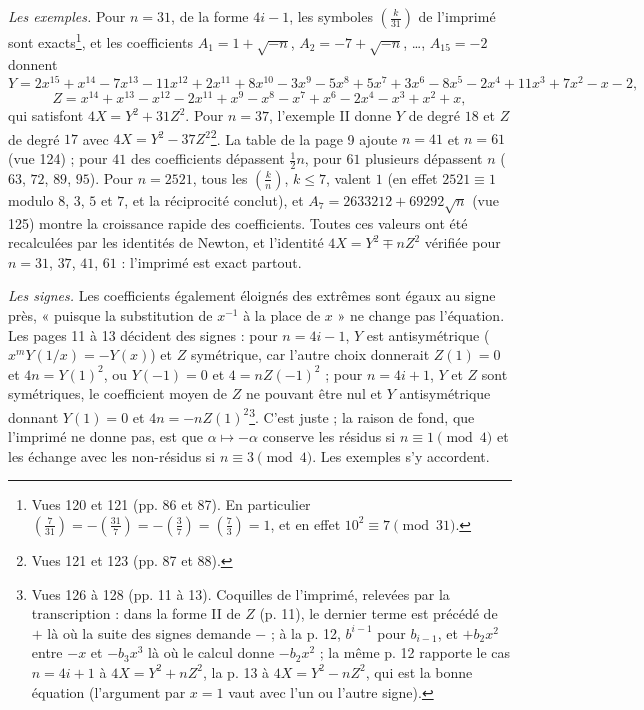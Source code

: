 \documentclass[11pt,a4paper]{article}
\begin{document}
\emph{Les exemples.} Pour $n=31$, de la forme $4i-1$, les symboles $\left(\frac{k}{31}\right)$ de l'imprimé sont exacts\footnote{Vues 120 et 121 (pp. 86 et 87). En particulier $\left(\frac{7}{31}\right)=-\left(\frac{31}{7}\right)=-\left(\frac37\right)=\left(\frac73\right)=1$, et en effet $10^2\equiv7\pmod{31}$.}, et les coefficients $A_1=1+\sqrt{-n}$, $A_2=-7+\sqrt{-n}$, …, $A_{15}=-2$ donnent
\[ Y=2x^{15}+x^{14}-7x^{13}-11x^{12}+2x^{11}+8x^{10}-3x^9-5x^8+5x^7+3x^6-8x^5-2x^4+11x^3+7x^2-x-2, \]
\[ Z=x^{14}+x^{13}-x^{12}-2x^{11}+x^9-x^8-x^7+x^6-2x^4-x^3+x^2+x, \]
qui satisfont $4X=Y^2+31Z^2$. Pour $n=37$, l'exemple II donne $Y$ de degré $18$ et $Z$ de degré $17$ avec $4X=Y^2-37Z^2$\footnote{Vues 121 et 123 (pp. 87 et 88).}. La table de la page 9 ajoute $n=41$ et $n=61$ (vue 124) ; pour $41$ des coefficients dépassent $\frac12n$, pour $61$ plusieurs dépassent $n$ ($63$, $72$, $89$, $95$). Pour $n=2521$, tous les $\left(\frac{k}{n}\right)$, $k\le 7$, valent $1$ (en effet $2521\equiv1$ modulo $8$, $3$, $5$ et $7$, et la réciprocité conclut), et $A_7=2633212+69292\sqrt n$ (vue 125) montre la croissance rapide des coefficients. Toutes ces valeurs ont été recalculées par les identités de Newton, et l'identité $4X=Y^2\mp nZ^2$ vérifiée pour $n=31$, $37$, $41$, $61$ : l'imprimé est exact partout.

\emph{Les signes.} Les coefficients également éloignés des extrêmes sont égaux au signe près, « puisque la substitution de $x^{-1}$ à la place de $x$ » ne change pas l'équation. Les pages 11 à 13 décident des signes : pour $n=4i-1$, $Y$ est antisymétrique ($x^mY(1/x)=-Y(x)$) et $Z$ symétrique, car l'autre choix donnerait $Z(1)=0$ et $4n=Y(1)^2$, ou $Y(-1)=0$ et $4=nZ(-1)^2$ ; pour $n=4i+1$, $Y$ et $Z$ sont symétriques, le coefficient moyen de $Z$ ne pouvant être nul et $Y$ antisymétrique donnant $Y(1)=0$ et $4n=-nZ(1)^2$\footnote{Vues 126 à 128 (pp. 11 à 13). Coquilles de l'imprimé, relevées par la transcription : dans la forme II de $Z$ (p. 11), le dernier terme est précédé de $+$ là où la suite des signes demande $-$ ; à la p. 12, $b^{i-1}$ pour $b_{i-1}$, et $+b_2x^2$ entre $-x$ et $-b_3x^3$ là où le calcul donne $-b_2x^2$ ; la même p. 12 rapporte le cas $n=4i+1$ à $4X=Y^2+nZ^2$, la p. 13 à $4X=Y^2-nZ^2$, qui est la bonne équation (l'argument par $x=1$ vaut avec l'un ou l'autre signe).}. C'est juste ; la raison de fond, que l'imprimé ne donne pas, est que $\alpha\mapsto-\alpha$ conserve les résidus si $n\equiv1\pmod 4$ et les échange avec les non-résidus si $n\equiv 3\pmod 4$. Les exemples s'y accordent.
\end{document}
